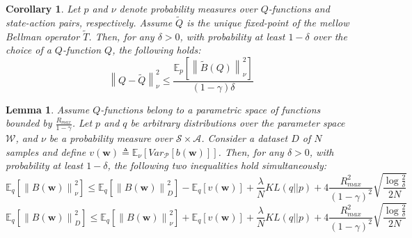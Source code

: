 \documentclass{article}
\newtheorem{lemma}{Lemma}
\newtheorem{corollary}{Corollary}
\newcommand{\wt}[1]{\widetilde{#1}}
\newcommand{\norm}[1]{\left\lVert #1 \right\rVert}
\begin{document}
\begin{corollary}
Let $p$ and $\nu$ denote probability measures over $Q$-functions and state-action pairs, respectively. Assume $\wt{Q}$ is the unique fixed-point of the mellow Bellman operator $\wt{T}$. Then, for any $\delta > 0$, with probability at least $1 - \delta$ over the choice of a $Q$-function $Q$, the following holds:
\begin{equation}
\norm{Q - \wt{Q}}_{\nu}^2 \leq \frac{\mathbb{E}_p\left[ \norm{\wt{B}(Q)}_{\nu}^2 \right]}{(1-\gamma)\delta}
\end{equation}
\end{corollary}

\begin{lemma}\label{lemma:l2}
Assume $Q$-functions belong to a parametric space of functions bounded by $\frac{R_{max}}{1-\gamma}$. Let $p$ and $q$ be arbitrary distributions over the parameter space $\mathcal{W}$, and $\nu$ be a probability measure over $\mathcal{S}\times\mathcal{A}$. Consider a dataset $D$ of $N$ samples and define $v(\bm{w}) \triangleq \mathbb{E}_{\nu}\left[Var_{\mathcal{P}}\left[b(\bm{w})\right]\right]$. Then, for any $\delta > 0$, with probability at least $1-\delta$, the following two inequalities hold simultaneously:
\begin{equation}\label{eq:lemma2-1}
\mathbb{E}_q\left[ \norm{B(\bm{w})}_{\nu}^2 \right ] \leq \mathbb{E}_q\left[ \norm{B(\bm{w})}_D^2 \right] - \mathbb{E}_q\left[ v(\bm{w}) \right] + \frac{\lambda}{N} KL(q||p) + 4\frac{R_{max}^2}{(1-\gamma)^2}\sqrt{\frac{\log\frac{2}{\delta}}{2N}}
\end{equation}
\begin{equation}\label{eq:lemma2-2}
\mathbb{E}_q\left[ \norm{B(\bm{w})}_D^2 \right] \leq \mathbb{E}_q\left[ \norm{B(\bm{w})}_{\nu}^2 \right ] + \mathbb{E}_q\left[ v(\bm{w}) \right] + \frac{\lambda}{N} KL(q||p) + 4\frac{R_{max}^2}{(1-\gamma)^2}\sqrt{\frac{\log\frac{2}{\delta}}{2N}}
\end{equation}
\end{lemma}
\end{document}
